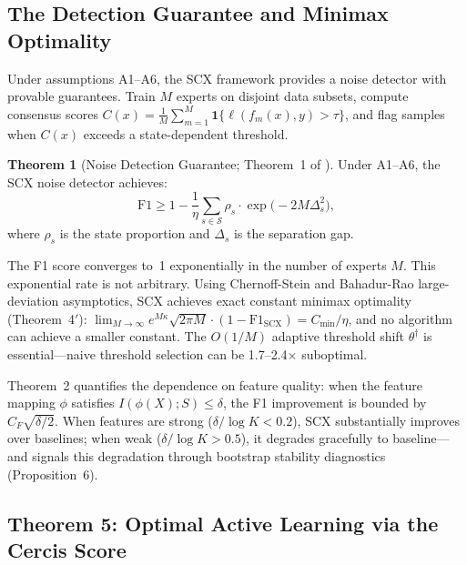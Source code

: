 \documentclass[twocolumn]{article}
\theoremstyle{definition}
\newtheorem{theorem}{Theorem}
\begin{document}
\subsection{The Detection Guarantee and Minimax Optimality}

Under assumptions A1--A6, the SCX framework provides a noise detector with provable guarantees. Train $M$ experts on disjoint data subsets, compute consensus scores $C(x) = \frac{1}{M}\sum_{m=1}^M \mathbf{1}\{\ell(f_m(x), y) > \tau\}$, and flag samples when $C(x)$ exceeds a state-dependent threshold.

\begin{theorem}[Noise Detection Guarantee; Theorem~1 of \cite{paperI}]
\label{thm:detection}
Under A1--A6, the SCX noise detector achieves:
\begin{equation}
\mathrm{F1} \geq 1 - \frac{1}{\eta}\sum_{s\in\mathcal{S}} \rho_s \cdot \exp\bigl(-2M\Delta_s^2\bigr),
\end{equation}
where $\rho_s$ is the state proportion and $\Delta_s$ is the separation gap.
\end{theorem}

The F1 score converges to~1 exponentially in the number of experts $M$. This exponential rate is not arbitrary. Using Chernoff-Stein and Bahadur-Rao large-deviation asymptotics, SCX achieves exact constant minimax optimality (Theorem~4$'$): $\lim_{M\to\infty} e^{M\kappa}\sqrt{2\pi M}\cdot(1-\mathrm{F1}_{\mathrm{SCX}}) = C_{\min}/\eta$, and no algorithm can achieve a smaller constant. The $O(1/M)$ adaptive threshold shift $\theta^\dagger$ is essential---naive threshold selection can be 1.7--2.4$\times$ suboptimal.

Theorem~2 quantifies the dependence on feature quality: when the feature mapping $\phi$ satisfies $I(\phi(X);S) \leq \delta$, the F1 improvement is bounded by $C_F\sqrt{\delta/2}$. When features are strong ($\delta/\log K < 0.2$), SCX substantially improves over baselines; when weak ($\delta/\log K > 0.5$), it degrades gracefully to baseline---and signals this degradation through bootstrap stability diagnostics (Proposition~6).

\subsection{Theorem 5: Optimal Active Learning via the Cercis Score}
\end{document}
